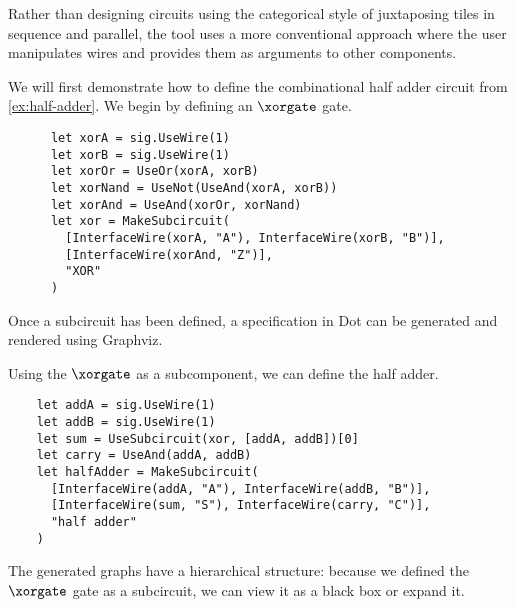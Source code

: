 Rather than designing circuits using the categorical style of juxtaposing
tiles in sequence and parallel, the tool uses a more conventional approach
where the user manipulates wires and provides them as arguments to other
components.

\begin{example}
  We will first demonstrate how to define the combinational half adder circuit
  from \cref{ex:half-adder}.
  We begin by defining an \(\xorgate\) gate.
  \begin{lstlisting}
      let xorA = sig.UseWire(1)
      let xorB = sig.UseWire(1)
      let xorOr = UseOr(xorA, xorB)
      let xorNand = UseNot(UseAnd(xorA, xorB))
      let xorAnd = UseAnd(xorOr, xorNand)
      let xor = MakeSubcircuit(
        [InterfaceWire(xorA, "A"), InterfaceWire(xorB, "B")],
        [InterfaceWire(xorAnd, "Z")],
        "XOR"
      )
    \end{lstlisting}

  Once a subcircuit has been defined, a specification in Dot can be generated
  and rendered using Graphviz.

  \begin{center}
    
  \end{center}

  Using the \(\xorgate\) as a subcomponent, we can define the half adder.

  \begin{lstlisting}
    let addA = sig.UseWire(1)
    let addB = sig.UseWire(1)
    let sum = UseSubcircuit(xor, [addA, addB])[0]
    let carry = UseAnd(addA, addB)
    let halfAdder = MakeSubcircuit(
      [InterfaceWire(addA, "A"), InterfaceWire(addB, "B")],
      [InterfaceWire(sum, "S"), InterfaceWire(carry, "C")],
      "half adder"
    )
    \end{lstlisting}

  The generated graphs have a hierarchical structure: because we defined the
  \(\xorgate\) gate as a subcircuit, we can view it as a black box or
  expand it.

  \begin{center}
    

    \vspace{1em}

    
  \end{center}
\end{example}

